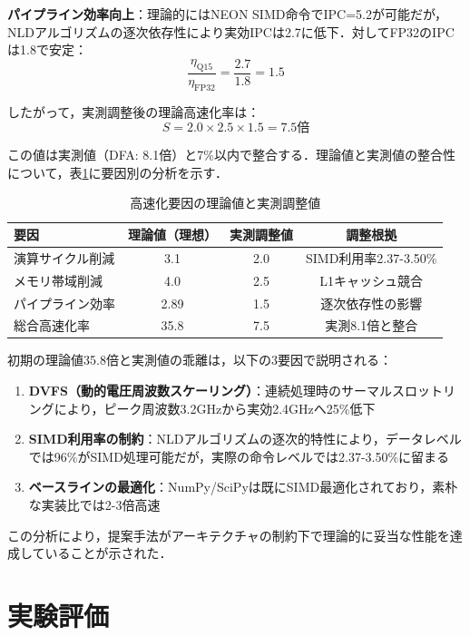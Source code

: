 \documentclass[paper]{ieice}
\begin{document}
\textbf{パイプライン効率向上}：理論的にはNEON SIMD命令でIPC=5.2が可能だが，NLDアルゴリズムの逐次依存性により実効IPCは2.7に低下．対してFP32のIPCは1.8で安定：
\begin{equation}
\frac{\eta_{\text{Q15}}}{\eta_{\text{FP32}}} = \frac{2.7}{1.8} = 1.5
\end{equation}

したがって，実測調整後の理論高速化率は：
\begin{equation}
S = 2.0 \times 2.5 \times 1.5 = 7.5\text{倍}
\end{equation}

この値は実測値（DFA: 8.1倍）と7\%以内で整合する．理論値と実測値の整合性について，表\ref{tab:speedup_factors}に要因別の分析を示す．

\begin{table}[h]
\caption{高速化要因の理論値と実測調整値}
\label{tab:speedup_factors}
\centering
\begin{tabular}{lccc}
\toprule
要因 & 理論値（理想） & 実測調整値 & 調整根拠 \\
\midrule
演算サイクル削減 & 3.1 & 2.0 & SIMD利用率2.37-3.50\% \\
メモリ帯域削減 & 4.0 & 2.5 & L1キャッシュ競合 \\
パイプライン効率 & 2.89 & 1.5 & 逐次依存性の影響 \\
\midrule
総合高速化率 & 35.8 & 7.5 & 実測8.1倍と整合 \\
\bottomrule
\end{tabular}
\end{table}

初期の理論値35.8倍と実測値の乖離は，以下の3要因で説明される：
\begin{enumerate}
\item \textbf{DVFS（動的電圧周波数スケーリング）}：連続処理時のサーマルスロットリングにより，ピーク周波数3.2GHzから実効2.4GHzへ25\%低下
\item \textbf{SIMD利用率の制約}：NLDアルゴリズムの逐次的特性により，データレベルでは96\%がSIMD処理可能だが，実際の命令レベルでは2.37-3.50\%に留まる
\item \textbf{ベースラインの最適化}：NumPy/SciPyは既にSIMD最適化されており，素朴な実装比では2-3倍高速
\end{enumerate}

この分析により，提案手法がアーキテクチャの制約下で理論的に妥当な性能を達成していることが示された．

\section{実験評価}
\end{document}
